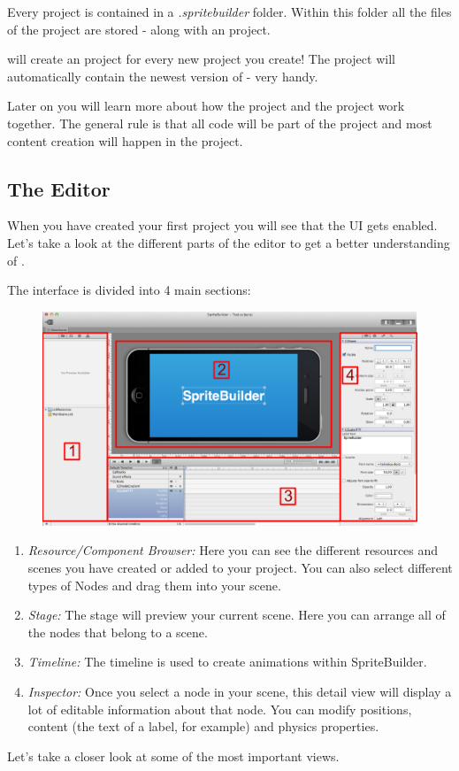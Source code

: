 Every \SB{} project is contained in a \textit{.spritebuilder} folder. Within
this folder all the files of the \SB{} project are stored - along with an \xcode{}
project. 

\begin{details} 
\SB{} will create an \xcode{} project for every new project you create! The
\xcode{} project will automatically contain the newest version of \cocos{} -
very handy.
\end{details}

Later on you will learn more about how the \SB{} project and the \xcode{}
project work together. The general rule is that all code will be part of the
\xcode{} project and most content creation will happen in the \SB{} project.

\subsection{The Editor}
When you have created your first \SB{} project you will see that the \SB{} UI
gets enabled. Let's take a look at the different parts of the editor to get a
better understanding of \SB{}.

The \SB{} interface is divided into 4 main sections:
\begin{figure}[H]
		\centering
		\includegraphics[width=0.9\linewidth]{images/spritebuilder/spritebuilder_ui.png}     
\end{figure} 
\begin{enumerate}
  \item \textit{Resource/Component Browser:} Here you can see the different
  resources and scenes you have created or added to your project. You can also select different types of Nodes and drag them into your scene.
  \item \textit{Stage:} The stage will preview your current scene. Here you can
  arrange all of the nodes that belong to a scene. 
  \item \textit{Timeline:} The timeline is used to create animations within
  SpriteBuilder.
  \item \textit{Inspector:} Once you select a node in your scene, this detail
  view will display a lot of editable information about that node. You can modify positions, content (the text of a label, for example) and physics properties.
\end{enumerate}
Let's take a closer look at some of the most important views.

